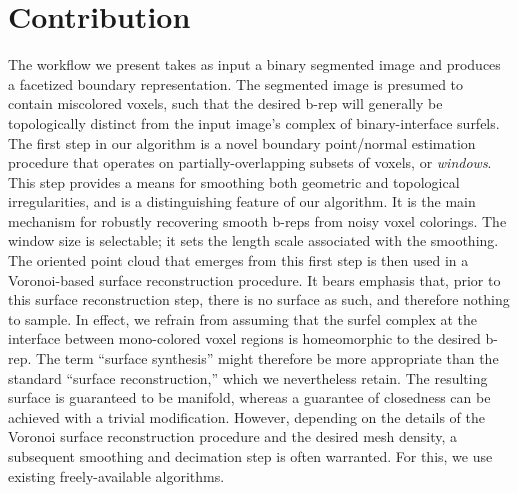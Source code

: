\section{Contribution}
\label{sec:Contribution}

The workflow we present takes as input a binary segmented image and produces a facetized boundary representation.  The segmented image is presumed to contain miscolored voxels, such that the desired b-rep will generally be topologically distinct from the input image's complex of binary-interface surfels.  The first step in our algorithm is a novel boundary point/normal estimation procedure that operates on partially-overlapping subsets of voxels, or {\em windows}.  This step provides a means for smoothing both geometric and topological irregularities, and is a distinguishing feature of our algorithm.  It is the main mechanism for robustly recovering smooth b-reps from noisy voxel colorings.  The window size is selectable; it sets the length scale associated with the smoothing.  The oriented point cloud that emerges from this first step is then used in a Voronoi-based surface reconstruction procedure.  It bears emphasis that, prior to this surface reconstruction step, there is no surface as such, and therefore nothing to sample.  In effect, we refrain from assuming that the surfel complex at the interface between mono-colored voxel regions is homeomorphic to the desired b-rep.  The term ``surface synthesis'' might therefore be more appropriate than the standard ``surface reconstruction,'' which we nevertheless retain. The resulting surface is guaranteed to be manifold, whereas a guarantee of closedness can be achieved with a trivial modification.  However, depending on the details of the Voronoi surface reconstruction procedure and the desired mesh density, a subsequent smoothing and decimation step is often warranted.  For this, we use existing freely-available algorithms.

